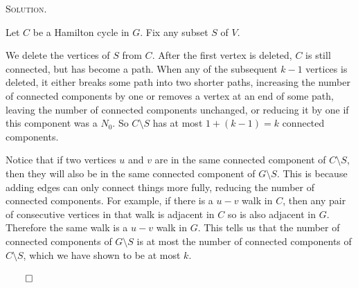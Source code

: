 \documentclass[12pt, a4paper, oneside]{ctexart}
\newenvironment{solution}{%
	\par\noindent\textsc{Solution. }\ignorespaces
}{%
	\hfill$\qed$\par
}
\begin{document}
	\begin{solution}
		Let $C$ be a Hamilton cycle in $G$. Fix any subset $S$ of $V$.

		We delete the vertices of $S$ from $C$. After the first vertex is deleted, $C$ is still connected, 
		but has become a path. When any of the subsequent $k - 1$ vertices is deleted, it either breaks some path into two shorter paths, 
		increasing the number of connected components by one or removes a vertex at an end of some path, leaving the number of connected components unchanged, or reducing it by one if this component was a $N_0$. 
		So $C \setminus S$ has at most $1 + (k - 1) = k$ connected components.

		Notice that if two vertices $u$ and $v$ are in the same connected component of $C \setminus S$, then they will also be in the same connected component of $G \setminus S$. 
		This is because adding edges can only connect things more fully, reducing the number of connected components. For example, if there is a $u - v$ walk in $C$, 
		then any pair of consecutive vertices in that walk is adjacent in $C$ so is also adjacent in $G$. Therefore the same walk is a $u - v$ walk in $G$. This tells us that the number of connected components of $G \setminus S$ is at most the number of connected components of $C \setminus S$, which we have shown to be at most $k$.

	\end{solution}
\end{document}
